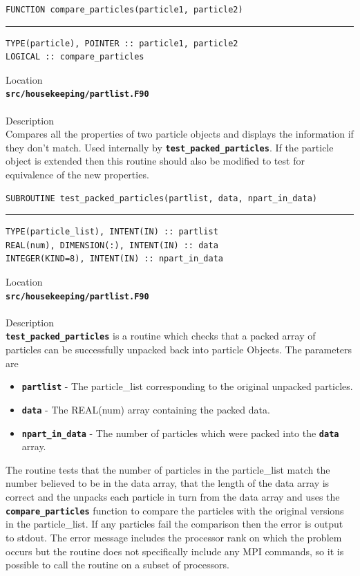 \documentclass[12pt,a4paper]{article}
\newcommand{\HRule}{\rule{\linewidth}{0.5mm}}
\newcommand{\inlinecode}[1]{{\color{warwickred} \bf\texttt{#1}}}
\newcommand{\codedef}{\begin{Verbatim}[formatcom=\color{warwickred},fontsize=\Large,hfuzz=0pt]}
\newcommand{\coderule}{
{\color{warwickred}\vspace{-0.5cm}\HRule}
\codedef}
\begin{document}
\codedef
FUNCTION compare_particles(particle1, particle2)
\end{Verbatim}
\coderule
TYPE(particle), POINTER :: particle1, particle2
LOGICAL :: compare_particles
\end{Verbatim}
\vspace{1cm}
{\Large Location\\}
\inlinecode{src/housekeeping/partlist.F90}\\
\\[0.5cm]
{\Large Description\\}
Compares all the properties of two particle objects and displays the
information if they don't match. Used internally by
\inlinecode{test\_packed\_particles}. If the particle object is extended then
this routine should also be modified to test for equivalence of the new
properties.
\\[0.5cm]

\codedef
SUBROUTINE test_packed_particles(partlist, data, npart_in_data)
\end{Verbatim}
\coderule
TYPE(particle_list), INTENT(IN) :: partlist
REAL(num), DIMENSION(:), INTENT(IN) :: data
INTEGER(KIND=8), INTENT(IN) :: npart_in_data
\end{Verbatim}
\vspace{1cm}
{\Large Location\\}
\inlinecode{src/housekeeping/partlist.F90}\\
\\[0.5cm]
{\Large Description\\}
\inlinecode{test\_packed\_particles} is a routine which checks that a packed
array of particles can be successfully unpacked back into particle Objects. The
parameters are
\begin{itemize}
\item \inlinecode{partlist} - The particle\_list corresponding to the original
  unpacked particles.
\item \inlinecode{data} - The REAL(num) array containing the packed data.
\item \inlinecode{npart\_in\_data} - The number of particles which were packed
  into the \inlinecode{data} array.
\end{itemize}
The routine tests that the number of particles in the particle\_list match the
number believed to be in the data array, that the length of the data array is
correct and the unpacks each particle in turn from the data array and uses the
\inlinecode{compare\_particles} function to compare the particles with the
original versions in the particle\_list. If any particles fail the comparison
then the error is output to stdout. The error message includes the processor
rank on which the problem occurs but the routine does not specifically include
any MPI commands, so it is possible to call the routine on a subset of
processors.
\\[0.5cm]
\end{document}

